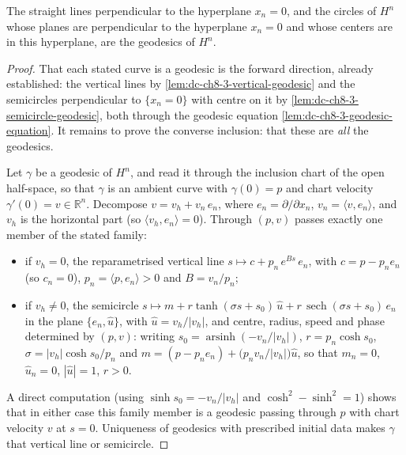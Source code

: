 \begin{proposition}[geodesics of $H^n$]
  \label{prop:dc-ch8-3-1}


  The straight lines perpendicular to the hyperplane $x_n=0$, and the circles of
  $H^n$ whose planes are perpendicular to the hyperplane $x_n=0$ and whose centers
  are in this hyperplane, are the geodesics of $H^n$.
\end{proposition}
\begin{proof}

\sketch
  That each stated curve is a geodesic is the forward direction, already established:
  the vertical lines by \cref{lem:dc-ch8-3-vertical-geodesic} and the semicircles
  perpendicular to $\{x_n=0\}$ with centre on it by
  \cref{lem:dc-ch8-3-semicircle-geodesic}, both through the geodesic equation
  \cref{lem:dc-ch8-3-geodesic-equation}. It remains to prove the converse inclusion:
  that these are \emph{all} the geodesics.

  Let $\gamma$ be a geodesic of $H^n$, and read it through the inclusion chart of the
  open half-space, so that $\gamma$ is an ambient curve with $\gamma(0)=p$ and chart
  velocity $\gamma'(0)=v\in\mathbb R^n$. Decompose $v=v_h+v_n\,e_n$, where
  $e_n=\partial/\partial x_n$, $v_n=\langle v,e_n\rangle$, and $v_h$ is the horizontal
  part (so $\langle v_h,e_n\rangle=0$). Through $(p,v)$ passes exactly one member of
  the stated family:
  \begin{itemize}
    \item if $v_h=0$, the reparametrised vertical line
      $s\mapsto c+p_n\,e^{Bs}\,e_n$, with $c=p-p_n e_n$ (so $c_n=0$), $p_n=\langle
      p,e_n\rangle>0$ and $B=v_n/p_n$;
    \item if $v_h\neq0$, the semicircle
      $s\mapsto m+r\tanh(\sigma s+s_0)\,\hat u+r\,\operatorname{sech}(\sigma s+s_0)\,e_n$
      in the plane $\{e_n,\hat u\}$, with $\hat u=v_h/|v_h|$, and centre, radius,
      speed and phase determined by $(p,v)$: writing $s_0=\operatorname{arsinh}(-v_n/|v_h|)$,
      $r=p_n\cosh s_0$, $\sigma=|v_h|\cosh s_0/p_n$ and
      $m=(p-p_n e_n)+\bigl(p_n v_n/|v_h|\bigr)\hat u$, so that $m_n=0$, $\hat u_n=0$,
      $|\hat u|=1$, $r>0$.
  \end{itemize}
  A direct computation (using $\sinh s_0=-v_n/|v_h|$ and
  $\cosh^2-\sinh^2=1$) shows that in either case this family member is a geodesic
  passing through $p$ with chart velocity $v$ at $s=0$. Uniqueness of geodesics with
  prescribed initial data makes $\gamma$ that vertical line or semicircle.
\end{proof}

